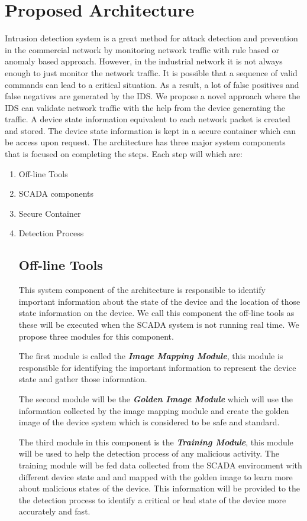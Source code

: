 \documentclass[conference]{IEEEtran}
\begin{document}
\section{Proposed Architecture}
Intrusion detection system is a great method for attack detection and prevention in the commercial network by monitoring network traffic with rule based or anomaly based approach. However, in the industrial network it is not always enough to just monitor the network traffic. It is possible that a sequence of valid commands can lead to a critical situation. As a result, a lot of false positives and false negatives are generated by the IDS. We propose a novel approach where the IDS can validate network traffic with the help from the device generating the traffic. A device state information equivalent to each network packet is created and stored. The device state information is kept in a secure container which can be access upon request. The architecture has three major system components that is focused on completing the steps. Each step will which are:
\begin{enumerate}
\item Off-line Tools
\item SCADA components
\item Secure Container
\item Detection Process
\subsection{Off-line Tools}
This system component of the architecture is responsible to identify important information about the state of the device and the location of those state information on the device. We call this component the off-line tools as these will be executed when the SCADA system is not running real time. We propose three modules for this component. 
\par The first module is called the \textit{\textbf{Image Mapping Module}}, this module is responsible for identifying the important information to represent the device state and gather those information.
\par The second module will be the \textit{\textbf{Golden Image Module}} which will use the information collected by the image mapping module and create the golden image of the device system which is considered to be safe and standard. \par The third module in this component is the \textit{\textbf{Training Module}}, this module will be used to help the detection process of any malicious activity. The training module will be fed data collected from the SCADA environment with different device state and and mapped with the golden image to learn more about malicious states of the device. This information will be provided to the the detection process to identify a critical or bad state of the device more accurately and fast.
\end{enumerate}
\end{document}
